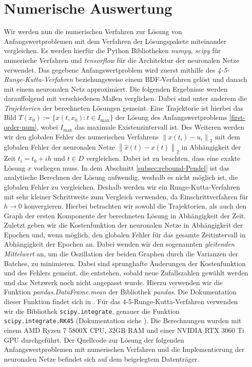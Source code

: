 \section{Numerische Auswertung}
\label{sec:verfahrensvergleich}
Wir werden nun die numerischen Verfahren zur Lösung von Anfangswertproblemen mit dem Verfahren der Lösungspakete
miteinander vergleichen. Es werden hierfür die Python Bibliotheken \textit{numpy}, \textit{scipy} für numerische
Verfahren und \textit{tensorflow} für die Architektur der neuronalen Netze verwendet. Das gegebene
Anfangswertproblem wird zuerst mithilfe des \textit{4-5-Runge-Kutta-Verfahren} beziehungsweise einem BDF-Verfahren
gelöst und danach mit einem neuronalen Netz approximiert. Die folgenden Ergebnisse werden darauffolgend mit
verschiedenen Maßen verglichen. Dabei sind unter anderem die \textit{Trajektorien} der berechneten Lösungen gemeint.
Eine Trajektorie ist hierbei das Bild $T(x_0):= \{x(t,x_0): t\in I_{\text{max}}\}$ der Lösung des Anfangswertproblems
\eqref{first-order-num}, wobei $I_{\text{max}}$ das maximale Existenzintervall ist. Des Weiteren werden wir den globalen
Fehler des numerischen Verfahrens $\left\lVert x(t_i) - u_i \right\rVert_2$ mit dem globalen Fehler der neuronalen Netze
$\left\lVert \hat{x}(t) - x(t) \right\rVert_2$ in Abhängigkeit der Zeit $t_i=t_0 + ih$ und $t\in D$ vergleichen. Dabei
ist zu beachten, dass eine exakte Lösung $x$ vorliegen muss. In dem Abschnitt \ref{subsec:rebound-Pendel} ist das
analytische Berechnen der Lösung aufwendig, weshalb es nicht möglich ist, die globalen Fehler zu vergleichen. Deshalb
werden wir ein Runge-Kutta-Verfahren mit sehr kleiner Schrittweite zum Vergleich verwenden, da Einschrittverfahren für
$h \rightarrow 0$ konvergieren. Hierbei betrachten wir sowohl die Trajektorien, als auch den Graph der ersten Komponente
der berechneten Lösung in Abhängigkeit der Zeit.
Zuletzt geben wir die Kostenfunktion der neuronalen Netze in Abhängigkeit der Epochen und, wenn möglich, den globalen
Fehler für das gesamte Zeitintervall in Abhängigkeit der Epochen an. Dabei wenden wir den sogenannten
\textit{gleitenden Mittelwert} an, um die Oszillation der beiden Graphen durch die Varianzen der Batches, zu
minimieren. Dabei sind sprunghafte Änderungen der Kostenfunktion und des Fehlers gemeint, die entstehen, sobald neue
Zufallszahlen gewählt werden und das Netzwerk noch nicht angepasst wurde. Hierzu verwenden wir die Funktion
\textit{pandas.DataFrame.mean} der Bibliothek \textit{pandas}. Die Dokumentation dieser Funktion findet sich in
\cite{PandasDataFrameMean}. Für das 4-5-Runge-Kutta-Verfahren verwenden wir die Bibliothek \texttt{scipy.integrate},
genauer die Funktion \texttt{scipy.integrate.RK45} (Dokumentation siehe \cite{ScipyIntegrateRK45}). Die Berechnungen
wurden mit einem AMD Ryzen 7 5800X CPU, 32GB RAM und einer NVIDIA RTX 3060 Ti GPU durchgeführt. Der Quellcode zur Lösung
der folgenden Anfangswertproblemen mit numerischen Verfahren und die Implementierung der neuronalen Netze befindet sich
auf dem beigelegtem Datenträger.

